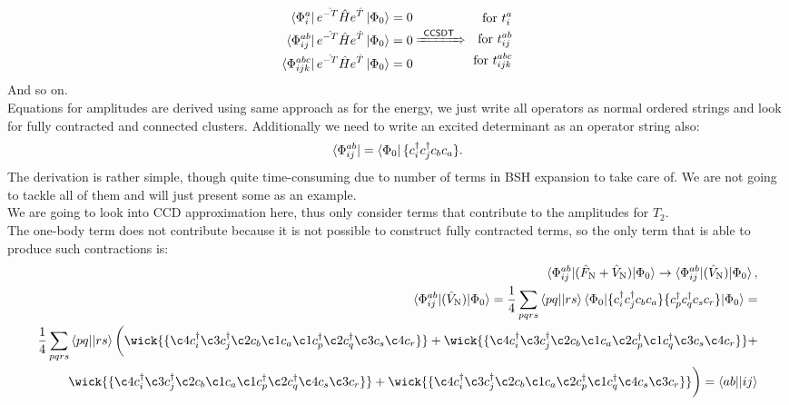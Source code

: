\documentclass[twoside,english]{uiofysmaster}
\theoremstyle{definition}
\begin{document}
\begin{eqnarray}
\begin{aligned}
\bra{\Phi_{i}^{a}}e^{\hat{-T}} \hat{H} e^{\hat{T}} \ket{\Phi_0}   = 0  \\
\bra{\Phi_{ij}^{ab}}e^{\hat{-T}} \hat{H} e^{\hat{T}} \ket{\Phi_0}   = 0 \\
\bra{\Phi_{ijk}^{abc}}e^{\hat{-T}} \hat{H} e^{\hat{T}} \ket{\Phi_0}   = 0  \\ \end{aligned}
\xRightarrow{~\textsf{CCSDT}~}
\begin{aligned}
\text{ for  $t_{i}^{a}$} \\
\text{ for  $t_{ij}^{ab}$} \\
\text{ for  $t_{ijk}^{abc}$} \end{aligned}
\end{eqnarray}
And so on.\\
Equations for amplitudes are derived using same approach as for the energy, we just write all operators as normal ordered strings and look for fully contracted and connected clusters. Additionally we need to write an excited determinant as an operator string also:
\begin{eqnarray}
\bra{\Phi_{ij}^{ab}} = \bra{\Phi_0} \{  c_i^\dagger c_j^\dagger  c_b  c_a \}.
\end{eqnarray}
The derivation is rather simple, though quite time-consuming due to number of terms in BSH expansion to take care of. We are not going to tackle all of them and will just present some as an example.\\
We are going to look into CCD approximation here, thus only consider terms that contribute to the amplitudes for $\hat{T}_2$.\\
The one-body term does not contribute because it is not possible to construct fully contracted terms, so the only term that is able to produce such contractions is:
\begin{eqnarray}
\braket{\Phi_{ij}^{ab}|(\hat{F}_\text{N}+\hat{V}_\text{N})|\Phi_0} \rightarrow \braket{\Phi_{ij}^{ab}|(\hat{V}_\text{N})|\Phi_0},\nonumber \\
\braket{\Phi_{ij}^{ab}|(\hat{V}_\text{N})|\Phi_0} = \frac{1}{4}\sum_{pqrs} \braket{pq||rs}\braket{\Phi_0| \{  c_i^\dagger c_j^\dagger  c_b  c_a \} \{  c_p^\dagger c_q^\dagger  c_s  c_r \} |\Phi_0}=\nonumber \\
 \frac{1}{4}\sum_{pqrs} \braket{pq||rs} \bigg( \wick{ \{ \c4 c_i^\dagger \c3 c_j^\dagger \c2 c_b \c1 c_a \c1  c_p^\dagger \c2 c_q^\dagger \c3 c_s \c4 c_r \}  } 
 + \wick{ \{ \c4 c_i^\dagger \c3 c_j^\dagger \c2 c_b \c1 c_a \c2  c_p^\dagger \c1 c_q^\dagger \c3 c_s \c4 c_r \}  } + \nonumber \\
  \wick{ \{ \c4 c_i^\dagger \c3 c_j^\dagger \c2 c_b \c1 c_a \c1  c_p^\dagger \c2 c_q^\dagger \c4 c_s \c3 c_r \}  }+\wick{ \{ \c4 c_i^\dagger \c3 c_j^\dagger \c2 c_b \c1 c_a \c2  c_p^\dagger \c1 c_q^\dagger \c4 c_s \c3 c_r \}  }  \bigg) =\braket{ab||ij}
\end{eqnarray}
\end{document}
